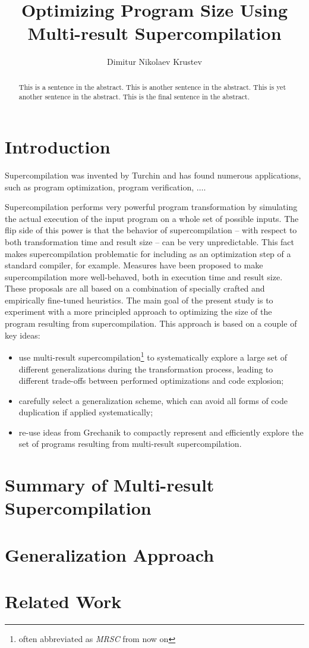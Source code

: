 \documentclass[submission,copyright,creativecommons]{eptcs}
\title{Optimizing Program Size Using Multi-result Supercompilation}
\author{Dimitur Nikolaev Krustev
\institute{IGE+XAO Balkan\\ Sofia, Bulgaria}
\email{\quad dkrustev@ige-xao.com}
}
\begin{document}
\maketitle

\begin{abstract}
This is a sentence in the abstract.
This is another sentence in the abstract.
This is yet another sentence in the abstract.
This is the final sentence in the abstract.
\end{abstract}

\section{Introduction}

Supercompilation was invented by Turchin\cite{TurchinSupercompilerConcept} and has found numerous
applications, such as program optimization\cite{XX,YY}, program verification\cite{Klyuchnikov},
$\ldots$.

Supercompilation performs very powerful program transformation by simulating
the actual execution of the input program on a whole set of possible inputs.
The flip side of this power is that the behavior of supercompilation -- 
with respect to both transformation time and result size --
can be very unpredictable.
This fact makes supercompilation problematic for including as an
optimization step of a standard compiler, for example.
Measures have been proposed to make supercompilation more
well-behaved, both in execution time and result size\cite{SPJBolingbroke,JohnsonNordlander}.
These proposals are all based on a combination of specially crafted and
empirically fine-tuned heuristics.
The main goal of the present study is to experiment with a more
principled approach to optimizing the size of the program resulting
from supercompilation.
This approach is based on a couple of key ideas:
\begin{itemize}
  \item use multi-result supercompilation\footnote{often abbreviated as \emph{MRSC} from now on} 
    to systematically explore a large set of different generalizations during 
    the transformation process, 
    leading to different trade-offs between performed optimizations and code explosion;
  \item carefully select a generalization scheme, which can avoid all forms of
    code duplication if applied systematically;
  \item re-use ideas from Grechanik\cite{BigStepMRSC} to compactly represent and efficiently
    explore the set of programs resulting from multi-result supercompilation.
\end{itemize}

\section{Summary of Multi-result Supercompilation}

\section{Generalization Approach}

\section{Related Work}



\end{document}
